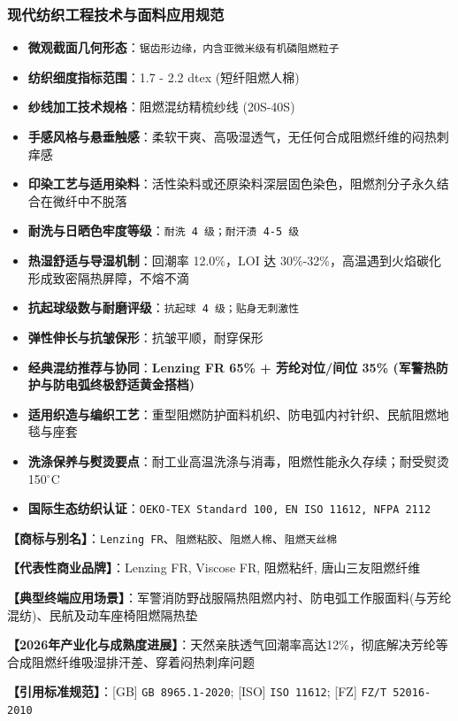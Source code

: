 \documentclass[11pt,openright,twoside,UTF8]{ctexbook}
\begin{document}
\subsubsection*{现代纺织工程技术与面料应用规范}
\begin{itemize} \setlength{\itemsep}{2pt}
    \item \textbf{微观截面几何形态}：\texttt{锯齿形边缘，内含亚微米级有机磷阻燃粒子}
    \item \textbf{纺织细度指标范围}：1.7 - 2.2 dtex (短纤阻燃人棉)
    \item \textbf{纱线加工技术规格}：阻燃混纺精梳纱线 (20S-40S)
    \item \textbf{手感风格与悬垂触感}：柔软干爽、高吸湿透气，无任何合成阻燃纤维的闷热刺痒感
    \item \textbf{印染工艺与适用染料}：活性染料或还原染料深层固色染色，阻燃剂分子永久结合在微纤中不脱落
    \item \textbf{耐洗与日晒色牢度等级}：\texttt{耐洗 4 级；耐汗渍 4-5 级}
    \item \textbf{热湿舒适与导湿机制}：回潮率 12.0\%，LOI 达 30\%-32\%，高温遇到火焰碳化形成致密隔热屏障，不熔不滴
    \item \textbf{抗起球级数与耐磨评级}：\texttt{抗起球 4 级；贴身无刺激性}
    \item \textbf{弹性伸长与抗皱保形}：抗皱平顺，耐穿保形
    \item \textbf{经典混纺推荐与协同}：\textbf{Lenzing FR 65\% + 芳纶对位/间位 35\% (军警热防护与防电弧终极舒适黄金搭档)}
    \item \textbf{适用织造与编织工艺}：重型阻燃防护面料机织、防电弧内衬针织、民航阻燃地毯与座套
    \item \textbf{洗涤保养与熨烫要点}：耐工业高温洗涤与消毒，阻燃性能永久存续；耐受熨烫 150$^\circ\mathrm{C}$
    \item \textbf{国际生态纺织认证}：\texttt{OEKO-TEX Standard 100, EN ISO 11612, NFPA 2112}
\end{itemize}
\vspace{0.2cm}

\noindent\textbf{【商标与别名】}：\texttt{Lenzing FR}、\texttt{阻燃粘胶}、\texttt{阻燃人棉}、\texttt{阻燃天丝棉}\par
\noindent\textbf{【代表性商业品牌】}：Lenzing FR, Viscose FR, 阻燃粘纤, 唐山三友阻燃纤维\par
\noindent\textbf{【典型终端应用场景】}：军警消防野战服隔热阻燃内衬、防电弧工作服面料(与芳纶混纺)、民航及动车座椅阻燃隔热垫\par
\noindent\textbf{【2026年产业化与成熟度进展】}：天然亲肤透气回潮率高达12\%，彻底解决芳纶等合成阻燃纤维吸湿排汗差、穿着闷热刺痒问题\par
\noindent\textbf{【引用标准规范】}：[GB] \texttt{GB 8965.1-2020}; [ISO] \texttt{ISO 11612}; [FZ] \texttt{FZ/T 52016-2010}\par
\vspace{0.5cm}
\end{document}
